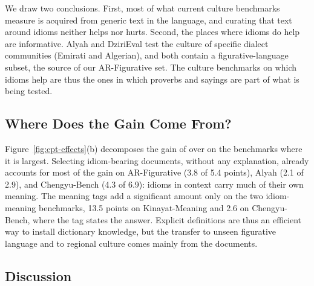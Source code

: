 We draw two conclusions. First, most of what current culture benchmarks measure is acquired from generic text in the language, and curating that text around idioms neither helps nor hurts. Second, the places where idioms do help are informative. Alyah and DziriEval test the culture of specific dialect communities (Emirati and Algerian), and both contain a figurative-language subset, the source of our AR-Figurative set. The culture benchmarks on which idioms help are thus the ones in which proverbs and sayings are part of what is being tested.  

\subsection{Where Does the Gain Come From?}
\label{sec:results-decomp}

Figure~\ref{fig:cpt-effects}(b) decomposes the gain of \idiomcpt{} over \random{} on the benchmarks where it is largest. Selecting idiom-bearing documents, without any explanation, already accounts for most of the gain on AR-Figurative (3.8 of 5.4 points), Alyah (2.1 of 2.9), and Chengyu-Bench (4.3 of 6.9): idioms in context carry much of their own meaning. The meaning tags add a significant amount only on the two idiom-meaning benchmarks, 13.5 points on Kinayat-Meaning and 2.6 on Chengyu-Bench, where the tag states the answer. Explicit definitions are thus an efficient way to install dictionary knowledge, but the transfer to unseen figurative language and to regional culture comes mainly from the documents.

\subsection{Discussion}
\label{sec:discussion}

